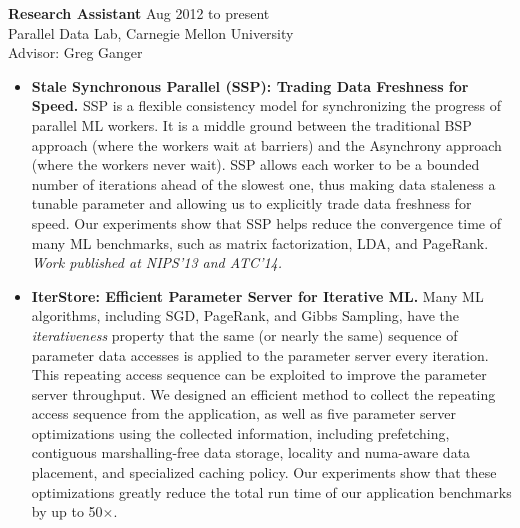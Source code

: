 \documentclass[10pt]{article}
\newenvironment{innerlist}[1][\enskip\textbullet]%
        {\begin{itemize}[#1,leftmargin=*,parsep=0pt,itemsep=0pt,topsep=0pt,partopsep=0pt]}
        {\end{itemize}}
\begin{document}
\textbf{Research Assistant} \hfill {Aug 2012 to present}\\
Parallel Data Lab, Carnegie Mellon University\\
Advisor: Greg Ganger
\begin{innerlist}
\item[] {\bf Stale Synchronous Parallel (SSP): Trading Data Freshness for Speed.}
    SSP is a flexible consistency model for synchronizing the progress of parallel ML workers. It is a middle ground between the traditional BSP approach (where the workers wait at barriers) and the Asynchrony approach (where the workers never wait). SSP allows each worker to be a bounded number of iterations ahead of the slowest one, thus making data staleness a tunable parameter and allowing us to explicitly trade data freshness for speed. Our experiments show that SSP helps reduce the convergence time of many ML benchmarks, such as matrix factorization, LDA, and PageRank. \\
    \emph{Work published at NIPS'13 and ATC'14.}
\vspace{.1in}
\item[] {\bf IterStore: Efficient Parameter Server for Iterative ML.}
    Many ML algorithms, including SGD, PageRank, and Gibbs Sampling, have the \emph{iterativeness} property that the same (or nearly the same) sequence of parameter data accesses is applied to the parameter server every iteration. This repeating access sequence can be exploited to improve the parameter server throughput. We designed an efficient method to collect the repeating access sequence from the application, as well as five parameter server optimizations using the collected information, including prefetching, contiguous marshalling-free data storage, locality and numa-aware data placement, and specialized caching policy. Our experiments show that these optimizations greatly reduce the total run time of our application benchmarks by up to 50$\times$. \\

\end{innerlist}
\end{document}
